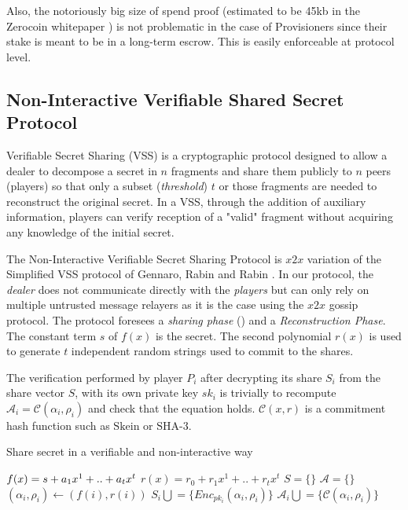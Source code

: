 Also, the notoriously big size of spend proof (estimated to be 45kb in the Zerocoin whitepaper \cite{zerocoin}) is not problematic in the case of Provisioners since their stake is meant to be in a long-term escrow. This is easily enforceable at protocol level.



\subsection{Non-Interactive Verifiable Shared Secret Protocol}

Verifiable Secret Sharing (VSS) is a cryptographic protocol designed to allow a dealer to decompose a secret in $n$ fragments and share them publicly to $n$ peers (players) so that only a subset (\textit{threshold}) $t$ or those fragments are needed to reconstruct the original secret. In a VSS, through the addition of auxiliary information, players can verify reception of a "valid" fragment without acquiring any knowledge of the initial secret.

The Non-Interactive Verifiable Secret Sharing Protocol is $x2x$ variation of the Simplified VSS protocol of Gennaro, Rabin and Rabin \cite{grr}. In our protocol, the \textit{dealer} does not communicate directly with the \textit{players} but can only rely on multiple untrusted message relayers as it is the case using the $x2x$ gossip protocol. The protocol foresees a \textit{sharing phase} () and a \textit{Reconstruction Phase}. The constant term $s$ of $f(x)$ is the secret. The second polynomial $r(x)$ is used to generate $t$ independent random strings used to commit to the shares.

The verification performed by player $P_i$ after decrypting its share $S_i$ from the share vector $S$, with its own private key $sk_i$ is trivially to recompute $\mathcal{A}_i = \mathcal{C}(\alpha_i, \rho_i)$ and check that the equation holds. $\mathcal{C}(x, r)$ is a commitment hash function such as $\textrm{Skein}$ or $\textrm{SHA-3}$.

    \begin{algorithm}
        \caption{Share secret in a verifiable and non-interactive way}
        \begin{algorithmic}[1]
             
                \State $f(x) = s \space + a_1x^1 + .. + a_tx^t$ 
                \State $r(x) = r_0 + r_1x^1 + .. + r_tx^t$ 
                \State $S = \{\}$
                \State $\mathcal{A} = \{\}$
                	\State $(\alpha_i, \rho_i) \leftarrow (f(i), r(i))$
                	\State $S_i \bigcup = \{Enc_{pk_i}(\alpha_i, \rho_i)\}$
                	\State $\mathcal{A}_i \bigcup = \{\mathcal{C}(\alpha_i, \rho_i)\}$
                \EndFor
            \EndProcedure
        \end{algorithmic}
    \end{algorithm}

